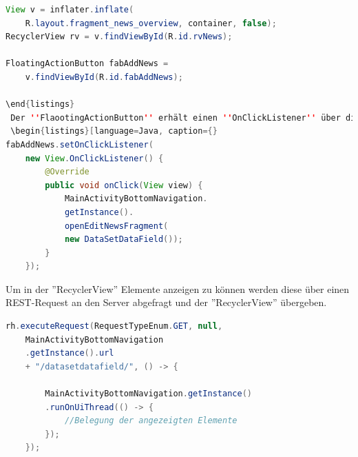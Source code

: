 \begin{lstlisting}[language=Java,caption={Zuweisungen von Variablen und FloatingActionButton-OnClickListener des NewsOverviewFragment }]
View v = inflater.inflate(
	R.layout.fragment_news_overview, container, false);
RecyclerView rv = v.findViewById(R.id.rvNews);

FloatingActionButton fabAddNews = 
    v.findViewById(R.id.fabAddNews);

\end{listings}
 Der ''FlaootingActionButton'' erhält einen ''OnClickListener'' über diesen wird in der ''MainActivity'' eine Methode aufgerufen die ein neues ''NewsEditFragment'' anzeigt, um ein neues ''DataSet'' zu erstellen. 
 \begin{listings}[language=Java, caption={}
fabAddNews.setOnClickListener(
	new View.OnClickListener() {
        @Override
        public void onClick(View view) {
            MainActivityBottomNavigation.
            getInstance().
            openEditNewsFragment(
            new DataSetDataField());
        }
    });
\end{lstlisting}
Um in der ''RecyclerView'' Elemente anzeigen zu können werden diese über einen REST-Request an den Server abgefragt und der ''RecyclerView'' übergeben.
\begin{lstlisting}[language=Java,caption={Anzeigen der abgefragten Elemente im NewsOverviewFragment}]
rh.executeRequest(RequestTypeEnum.GET, null,
	MainActivityBottomNavigation
	.getInstance().url 
	+ "/datasetdatafield/", () -> {

        MainActivityBottomNavigation.getInstance()
        .runOnUiThread(() -> {
            //Belegung der angezeigten Elemente
        });
    });
\end{lstlisting}
